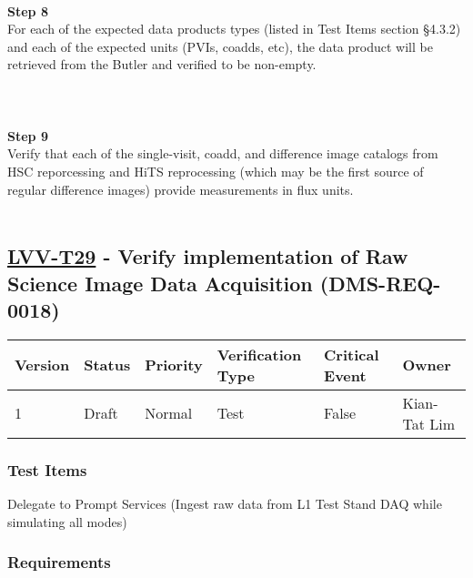 ~\\
\textbf{Step 8}\\
For each of the expected data products types (listed in Test Items
section §4.3.2) and each of the expected units (PVIs, coadds, etc), the
data product will be retrieved from the Butler and verified to be
non-empty.\\
~\\
~\\
~\\
\textbf{Step 9}\\
Verify that each of the single-visit, coadd, and difference image
catalogs from HSC reporcessing and HiTS reprocessing (which may be the
first source of regular difference images) provide measurements in flux
units.\\
~\\

\hypertarget{lvv-t29---verify-implementation-of-raw-science-image-data-acquisition-dms-req-0018}{%
\subsection{\texorpdfstring{\href{https://jira.lsstcorp.org/secure/Tests.jspa\#/testCase/LVV-T29}{LVV-T29}
- Verify implementation of Raw Science Image Data Acquisition
(DMS-REQ-0018)}{LVV-T29 - Verify implementation of Raw Science Image Data Acquisition (DMS-REQ-0018)}}\label{lvv-t29---verify-implementation-of-raw-science-image-data-acquisition-dms-req-0018}}

\begin{longtable}[]{@{}llllll@{}}
\toprule
Version & Status & Priority & Verification Type & Critical Event &
Owner\tabularnewline
\midrule
\endhead
1 & Draft & Normal & Test & False & Kian-Tat Lim\tabularnewline
\bottomrule
\end{longtable}

\hypertarget{test-items-5}{%
\subsubsection{Test Items}\label{test-items-5}}

Delegate to Prompt Services (Ingest raw data from L1 Test Stand DAQ
while simulating all modes)

\hypertarget{requirements-6}{%
\subsubsection{Requirements}\label{requirements-6}}

